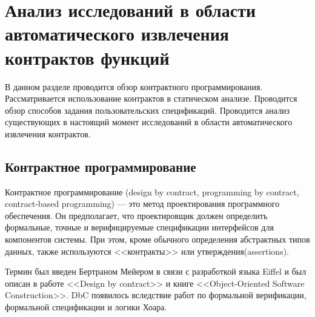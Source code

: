 \chapter{Анализ исследований в области автоматического извлечения контрактов функций}
В данном разделе проводится обзор контрактного программирования. Рассматривается использование контрактов в статическом анализе. Проводится обзор способов задания пользовательских спецификаций. Проводится анализ существующих в настоящий момент исследований в области автоматического извлечения контрактов.

\section{Контрактное программирование}
Контрактное программирование (design by contract, programming by contract, contract-based programming) --- это метод проектирования программного обеспечения. Он предполагает, что проектировщик должен определить формальные, точные и верифицируемые спецификации интерфейсов для компонентов системы. При этом, кроме обычного определения абстрактных типов данных, также используются <<контракты>> или утверждения(assertions).

Термин был введен Бертраном Мейером в связи с разработкой языка Eiffel и был описан в работе <<Design by contract>>\cite{designByContract} и книге <<Object-Oriented Software Construction>>\cite{oosc-meyer}. DbC появилось вследствие работ по формальной верификации, формальной спецификации и логики Хоара.

